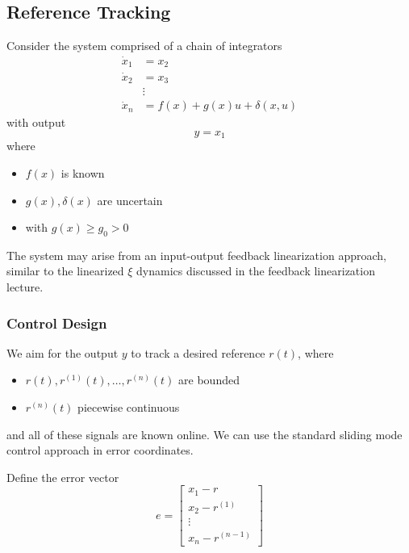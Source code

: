 \subsection{Reference Tracking}

Consider the system comprised of a chain of integrators
\begin{equation*}
    \begin{aligned}
        \dot{x}_1 & = x_2                         \\
        \dot{x}_2 & = x_3                         \\
                  & \vdots                        \\
        \dot{x}_n & = f(x) + g(x)u + \delta(x, u)
    \end{aligned}
\end{equation*}
with output
\begin{equation*}
    y = x_1
\end{equation*}
where
\begin{itemize}
    \item $f(x)$ is known
    \item $g(x), \delta(x)$ are uncertain
    \item with $g(x) \geq g_0 > 0$
\end{itemize}

\newpar{}

The system may arise from an input-output feedback linearization approach, similar to the linearized $\xi$ dynamics discussed in the feedback linearization lecture.

\subsubsection{Control Design}

We aim for the output $y$ to track a desired reference $r(t)$, where
\begin{itemize}
    \item $r(t), r^{(1)}(t), \dots, r^{(n)}(t)$ are bounded
    \item $r^{(n)}(t)$ piecewise continuous
\end{itemize}
and all of these signals are known online.
\newpar{}
We can use the standard sliding mode control approach in error coordinates.
\newpar{}

Define the error vector
\begin{equation*}
    e =
    \begin{bmatrix}
        x_1 - r       \\
        x_2 - r^{(1)} \\
        \vdots        \\
        x_n - r^{(n-1)}
    \end{bmatrix}
\end{equation*}

